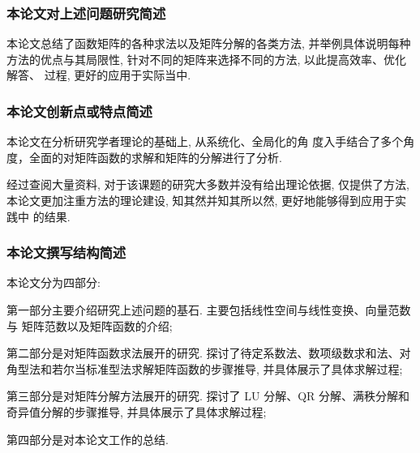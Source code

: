 \subsubsection{本论文对上述问题研究简述}

\par 本论文总结了函数矩阵的各种求法以及矩阵分解的各类方法, 并举例具体说明每种
方法的优点与其局限性, 针对不同的矩阵来选择不同的方法, 以此提高效率、优化解答、
过程, 更好的应用于实际当中.

\subsubsection{本论文创新点或特点简述}

\par 本论文在分析研究学者理论的基础上, 从系统化、全局化的角
度入手结合了多个角度，全面的对矩阵函数的求解和矩阵的分解进行了分析.

\par 经过查阅大量资料, 对于该课题的研究大多数并没有给出理论依据, 仅提供了方法,
本论文更加注重方法的理论建设, 知其然并知其所以然, 更好地能够得到应用于实践中
的结果.


\subsubsection{本论文撰写结构简述}

\par 本论文分为四部分:
\par 第一部分主要介绍研究上述问题的基石. 主要包括线性空间与线性变换、向量范数与
矩阵范数以及矩阵函数的介绍;
\par 第二部分是对矩阵函数求法展开的研究. 探讨了待定系数法、数项级数求和法、对
角型法和若尔当标准型法求解矩阵函数的步骤推导, 并具体展示了具体求解过程;
\par 第三部分是对矩阵分解方法展开的研究. 探讨了 LU 分解、QR 分解、满秩分解和
奇异值分解的步骤推导, 并具体展示了具体求解过程;
\par 第四部分是对本论文工作的总结.
























